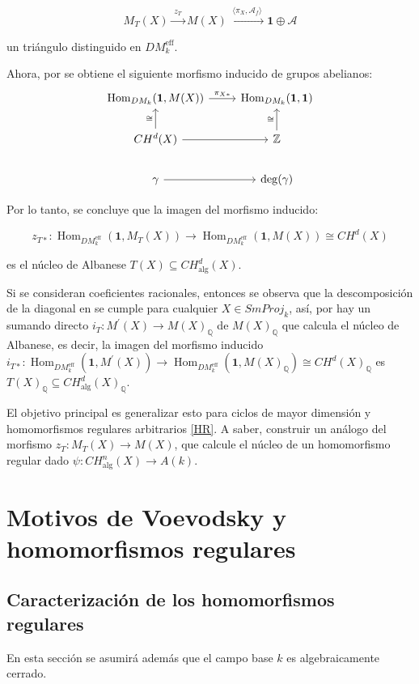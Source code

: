 \documentclass[10pt]{amsart}
\theoremstyle{definition}
\theoremstyle{remark}
\theoremstyle{definition}
\begin{document}
\[
M_{T}(X)\xrightarrow{\;z_{T}\;}M(X)\xrightarrow{\;\langle\pi_{X},\mathcal{A}_{f}\rangle\;} \mathbf{1}\oplus\mathcal{A}
\]

un triángulo distinguido en $DM^{\operatorname{eff}}_{k}$.

Ahora, por \cite[Prop. 2.1.4, Thm. 3.2.6]{Voe00b} se obtiene el siguiente morfismo inducido de grupos abelianos:
\begingroup{}
\[
\begin{tikzcd}
\operatorname{Hom}_{DM_{k}}(\mathbf{1},M(X))\arrow[r,"\pi_{X*}"]&\operatorname{Hom}_{DM_{k}}(\mathbf{1},\mathbf{1})\\
CH^{d}(X)\arrow[u, "\cong"]\arrow[r]&\mathbb{Z}\arrow[u, "\cong"]\\
\gamma\arrow[r]&\deg(\gamma)
\end{tikzcd}
\]
\endgroup

Por lo tanto, se  concluye que la imagen del morfismo inducido:

\[
z_{T*}:\operatorname{Hom}_{DM^{\operatorname{eff}}_{k}}(\mathbf{1},M_{T}(X))\to\operatorname{Hom}_{DM^{\operatorname{eff}}_{k}}(\mathbf{1},M(X))\cong CH^{d}(X)
\]

es el núcleo de Albanese $T(X)\subseteq CH^{d}_{\operatorname{alg}}(X)$.


Si se consideran coeficientes racionales, entonces se observa que la descomposición de la diagonal en \cite[7.1 Thm. 3]{Mur90} se cumple para cualquier $X\in SmProj_{k}$, así, por \cite[1.5B, 3.1 Thm.1 and 4.1 Thm. 2]{Mur90} hay un sumando directo $i_{T}:M^{\prime}(X)\to M(X)_{\mathbb{Q}}$ de $M(X)_{\mathbb{Q}}$ que calcula el núcleo de Albanese, es decir, la imagen del morfismo inducido $i_{T*}:\operatorname{Hom}_{DM^{\operatorname{eff}}_{k}}(\mathbf{1},M^{\prime}(X ))\to\operatorname{Hom}_{DM^{\operatorname{eff}}_{k}}(\mathbf{1},M(X)_{ \mathbb{Q}})\cong CH^{d}(X)_{\mathbb{Q}}$ es $T(X)_{\mathbb{Q}}\subseteq CH^{d}_{\mathrm{alg}}(X)_{\mathbb{Q}}$.

El objetivo principal es generalizar esto para ciclos de mayor dimensión y homomorfismos regulares arbitrarios \ref{HR}. A saber, construir un análogo del morfismo $z_{T}:M_{T}(X)\to M(X)$, que calcule el núcleo de un homomorfismo regular dado $\psi:CH^{n}_{\operatorname{alg}}(X)\to A(k)$.

\section{Motivos de Voevodsky y homomorfismos regulares}\label{MVHR}
\subsection{Caracterización de los homomorfismos regulares}\label{In}
En esta sección se asumirá además que el campo base $k$ es algebraicamente cerrado.
\end{document}

